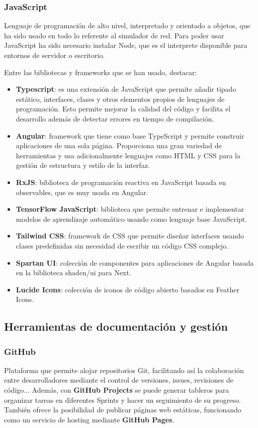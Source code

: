 \subsubsection{JavaScript}
\label{subsubsec:JavaScript}
Lenguaje de programación de alto nivel, interpretado y orientado a objetos, que ha sido usado en todo lo referente al simulador de red. Para poder usar JavaScript ha sido necesario instalar Node, que es el interprete disponible para entornos de servidor o escritorio.

Entre las bibliotecas y frameworks que se han usado, destacar:
\begin{itemize}
    \item \textbf{Typescript}: es una extensión de JavaScript que permite añadir tipado estático, interfaces, clases y otros elementos propios de lenguajes de programación. Esto permite mejorar la calidad del código y facilita el desarrollo además de detectar errores en tiempo de compilación.
    \item \textbf{Angular}: framework que tiene como base TypeScript y permite construir aplicaciones de una sola página. Proporciona una gran variedad de herramientas y usa adicionalmente lenguajes como HTML y CSS para la gestión de estructura y estilo de la interfaz.
    \item \textbf{RxJS}: biblioteca de programación reactiva en JavaScript basada en observables, que es muy usada en Angular. 
    \item \textbf{TensorFlow JavaScript}: biblioteca que permite entrenar e implementar modelos de aprendizaje automático usando como lenguaje base JavaScript.
    \item \textbf{Tailwind CSS}: framework de CSS que permite diseñar interfaces usando clases predefinidas sin necesidad de escribir un código CSS complejo.
    \item \textbf{Spartan UI}: colección de componentes para aplicaciones de Angular basada en la biblioteca shadcn/ui para Next.
    \item \textbf{Lucide Icons}: colección de iconos de código abierto basados en Feather Icons.
\end{itemize}

\subsection{Herramientas de documentación y gestión}
\label{subsec:Gestion}
\subsubsection{GitHub}
\label{subsubsec:GitHub}
Plataforma que permite alojar repositorios Git, facilitando así la colaboración entre desarrolladores mediante el control de versiones, issues, revisiones de código... Además, con \textbf{GitHub Projects} se puede generar tableros para organizar tareas en diferentes Sprints y hacer un seguimiento de su progreso. También ofrece la posibilidad de publicar páginas web estáticas, funcionando como un servicio de hosting mediante \textbf{GitHub Pages}.

